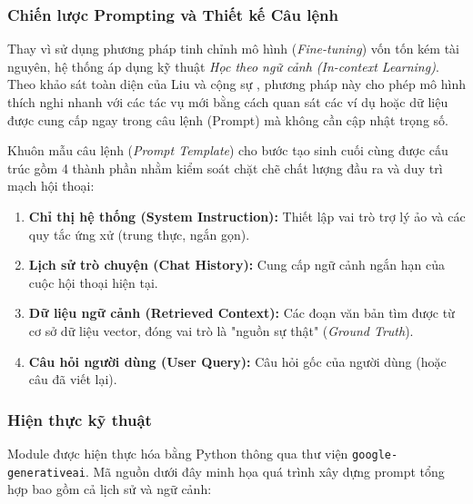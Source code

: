 \subsubsection{Chiến lược Prompting và Thiết kế Câu lệnh}

Thay vì sử dụng phương pháp tinh chỉnh mô hình (\textit{Fine-tuning}) vốn tốn kém tài nguyên, hệ thống áp dụng kỹ thuật \textit{Học theo ngữ cảnh (In-context Learning)}. Theo khảo sát toàn diện của Liu và cộng sự \cite{liu2023pre}, phương pháp này cho phép mô hình thích nghi nhanh với các tác vụ mới bằng cách quan sát các ví dụ hoặc dữ liệu được cung cấp ngay trong câu lệnh (Prompt) mà không cần cập nhật trọng số.

Khuôn mẫu câu lệnh (\textit{Prompt Template}) cho bước tạo sinh cuối cùng được cấu trúc gồm 4 thành phần nhằm kiểm soát chặt chẽ chất lượng đầu ra và duy trì mạch hội thoại:
\begin{enumerate}
    \item \textbf{Chỉ thị hệ thống (System Instruction):} Thiết lập vai trò trợ lý ảo và các quy tắc ứng xử (trung thực, ngắn gọn).
    \item \textbf{Lịch sử trò chuyện (Chat History):} Cung cấp ngữ cảnh ngắn hạn của cuộc hội thoại hiện tại.
    \item \textbf{Dữ liệu ngữ cảnh (Retrieved Context):} Các đoạn văn bản tìm được từ cơ sở dữ liệu vector, đóng vai trò là "nguồn sự thật" (\textit{Ground Truth}).
    \item \textbf{Câu hỏi người dùng (User Query):} Câu hỏi gốc của người dùng (hoặc câu đã viết lại).
\end{enumerate}

\subsubsection{Hiện thực kỹ thuật}
Module được hiện thực hóa bằng Python thông qua thư viện \texttt{google-generativeai}. Mã nguồn dưới đây minh họa quá trình xây dựng prompt tổng hợp bao gồm cả lịch sử và ngữ cảnh:

